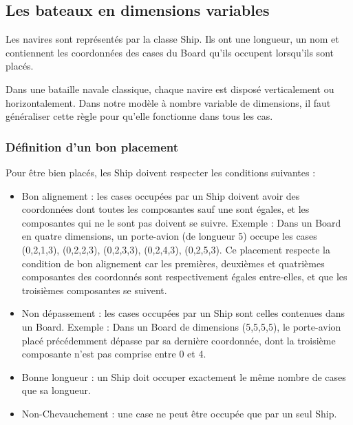 \subsection{Les bateaux en dimensions variables}
	Les navires sont représentés par la classe Ship. Ils ont une longueur, un nom et contiennent les coordonnées des cases du Board qu'ils occupent lorsqu'ils sont placés. \newline

	Dans une bataille navale classique, chaque navire est disposé verticalement ou horizontalement. Dans notre modèle à nombre variable de dimensions, il faut généraliser cette règle pour qu'elle fonctionne dans tous les cas.

\subsubsection{Définition d'un bon placement}

	Pour être bien placés, les Ship doivent respecter les conditions suivantes :
	\begin{itemize}
		\item Bon alignement : les cases occupées par un Ship doivent avoir des coordonnées dont toutes les composantes sauf une sont égales, et les composantes qui ne le sont pas doivent se suivre. \newline
		Exemple : Dans un Board en quatre dimensions, un porte-avion (de longueur 5) occupe les cases (0,2,1,3), (0,2,2,3), (0,2,3,3), (0,2,4,3), (0,2,5,3). Ce placement respecte la condition de bon alignement car les premières, deuxièmes et quatrièmes composantes des coordonnés sont respectivement égales entre-elles, et que les troisièmes composantes se suivent. \newline
		
		\item Non dépassement : les cases occupées par un Ship sont celles contenues dans un Board. \newline
		Exemple : Dans un Board de dimensions (5,5,5,5), le porte-avion placé précédemment dépasse par sa dernière coordonnée, dont la troisième composante n'est pas comprise entre 0 et 4. \newline
		
		\item Bonne longueur : un Ship doit occuper exactement le même nombre de cases que sa longueur. \newline
		
		\item Non-Chevauchement : une case ne peut être occupée que par un seul Ship.
	\end{itemize}



